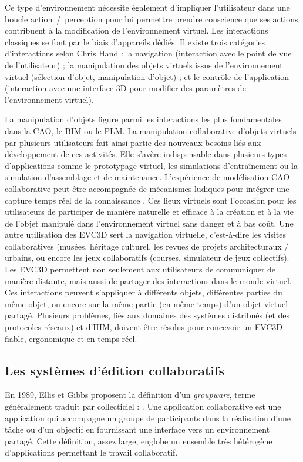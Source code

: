Ce type d'environnement nécessite également d'impliquer l'utilisateur dans une 
boucle \og ac\-tion~/~per\-ception\fg{} pour lui permettre prendre conscience
que ses actions contribuent à la modification de l'environnement virtuel. Les 
interactions classiques se font par le biais d'appareils dédiés.
Il existe trois catégories d'interactions selon Chris Hand \cite{Hand1997}: la 
navigation (interaction avec le point de vue de l'utilisateur) ; la manipulation des 
objets virtuels issus de l'environnement virtuel (sélection d'objet, manipulation 
d'objet) ; et le contrôle de l'application (interaction avec une interface \gls{3D} pour 
modifier des paramètres de l'environnement virtuel).

La manipulation d'objets figure parmi les interactions les plus fondamentales 
dans la \gls{CAO}, le \gls{BIM} ou le \gls{PLM}. La manipulation 
collaborative d'objets virtuels par plusieurs utilisateurs fait ainsi partie des 
nouveaux 
besoins liés aux développement de ces activités.
Elle s'avère indispensable dans plusieurs types 
d'applications comme le prototypage virtuel, les simulations d'entraînement ou la 
simulation d'assemblage et de maintenance. L'expérience de modélisation 
\gls{CAO} collaborative peut être accompagnée de mécanismes ludiques pour 
intégrer une capture temps réel de la connaissance \cite{Kosmadoudi2013}.
Ces lieux virtuels sont l'occasion pour les utilisateurs de participer de manière 
naturelle et efficace à la création et à la vie de l'objet manipulé dans 
l'environnement virtuel sans danger et à bas coût. 
Une autre utilisation des \gls{EVC3D} sert la navigation virtuelle, c'est-à-dire les 
visites collaboratives (musées, héritage culturel, les revues de projets 
architecturaux / urbains, ou encore les jeux collaboratifs (courses, simulateur de 
jeux collectifs). 
Les \gls{EVC3D} permettent non seulement aux utilisateurs de communiquer de 
manière distante, mais aussi de partager des 
interactions dans le monde virtuel. 
Ces interactions peuvent s'appliquer à différents objets, différentes parties du 
même objet, ou encore sur la même partie (en même temps) d'un objet virtuel 
partagé.
Plusieurs problèmes, liés aux domaines des systèmes distribués (et des 
protocoles 
réseaux) et d'\acrshort{IHM}, doivent être résolus pour concevoir un 
\gls{EVC3D} fiable, ergonomique et en temps réel. 



\subsection{Les systèmes d'édition collaboratifs}
En 1989, Ellis et Gibbs proposent la définition d'un \textit{groupware}, terme 
généralement traduit par collecticiel : 
. 
Une application collaborative est une application qui accompagne un groupe de 
participants dans la réalisation d'une tâche ou d'un objectif en fournissant une 
interface vers un environnement partagé. 
Cette définition, assez large, englobe un ensemble très hétérogène d'applications 
permettant le travail collaboratif. 

